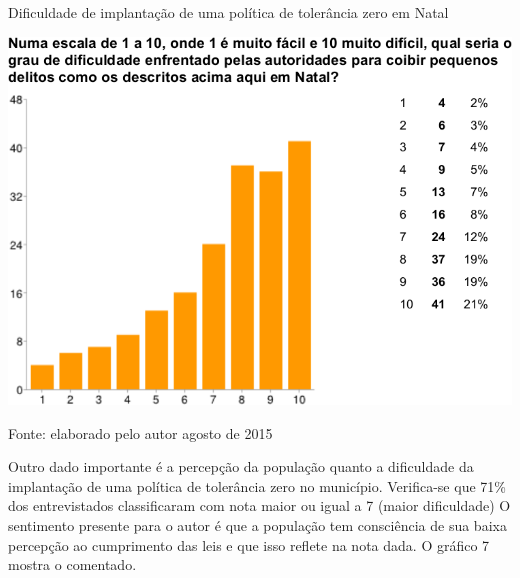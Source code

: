 \documentclass[
	12pt,				%
	openright,			%
	twoside,			%
	a4paper,			%
	chapter=TITLE,		%
	section=TITLE,		%
	subsection=TITLE,	%
	subsubsection=TITLE,%
	spanish,            %
	english,			%
	brazil				%
	]{abntex2}
\begin{document}
\begin{grafico}[!htpb]
	\caption{Dificuldade de implantação de uma política de tolerância zero em Natal}
	\begin{center}
	\includegraphics[scale=0.5]{percepcao.png}
	\end{center}
	\ABNTEXchapterfont\small{Fonte: elaborado pelo autor agosto de 2015}
	\label{Percepcao}
\end{grafico}
\par
Outro dado importante é a percepção da população quanto a dificuldade da implantação de uma política de tolerância zero no município. Verifica-se que 71\% dos entrevistados classificaram com nota maior ou igual a 7 (maior dificuldade) O sentimento presente para o autor é que a população tem consciência de sua baixa percepção ao cumprimento das leis e que isso reflete na nota dada. O gráfico 7 mostra o comentado.
\end{document}
